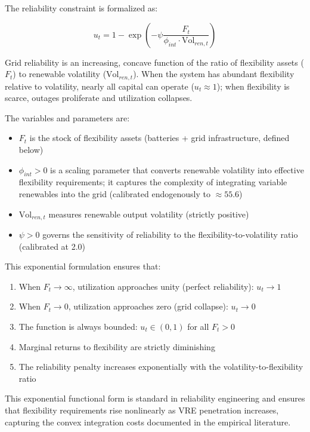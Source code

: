 \documentclass[12pt, a4paper]{article}
\begin{document}
	The reliability constraint is formalized as:
	
	\begin{equation}
		u_t = 1 - \exp\left(-\psi \frac{F_t}{\phi_{int} \cdot \text{Vol}_{ren,t}}\right)
		\label{eq:utilization}
	\end{equation}
	
	Grid reliability is an increasing, concave function of the ratio of flexibility assets ($F_t$) to renewable volatility ($\text{Vol}_{ren,t}$). When the system has abundant flexibility relative to volatility, nearly all capital can operate ($u_t \approx 1$); when flexibility is scarce, outages proliferate and utilization collapses.
	
	The variables and parameters are:
	\begin{itemize}
		\item $F_t$ is the stock of flexibility assets (batteries + grid infrastructure, defined below)
		\item $\phi_{int} > 0$ is a scaling parameter that converts renewable volatility into effective flexibility requirements; it captures the complexity of integrating variable renewables into the grid (calibrated endogenously to $\approx 55.6$)
		\item $\text{Vol}_{ren,t}$ measures renewable output volatility (strictly positive)
		\item $\psi > 0$ governs the sensitivity of reliability to the flexibility-to-volatility ratio (calibrated at 2.0)
	\end{itemize}
	
	This exponential formulation ensures that:
	\begin{enumerate}
		\item When $F_t \to \infty$, utilization approaches unity (perfect reliability): $u_t \to 1$
		\item When $F_t \to 0$, utilization approaches zero (grid collapse): $u_t \to 0$
		\item The function is always bounded: $u_t \in (0, 1)$ for all $F_t > 0$
		\item Marginal returns to flexibility are strictly diminishing
		\item The reliability penalty increases exponentially with the volatility-to-flexibility ratio
	\end{enumerate}
	
	This exponential functional form is standard in reliability engineering \citep{zakeri2015, lund2015} and ensures that flexibility requirements rise nonlinearly as VRE penetration increases, capturing the convex integration costs documented in the empirical literature.
	
\end{document}
